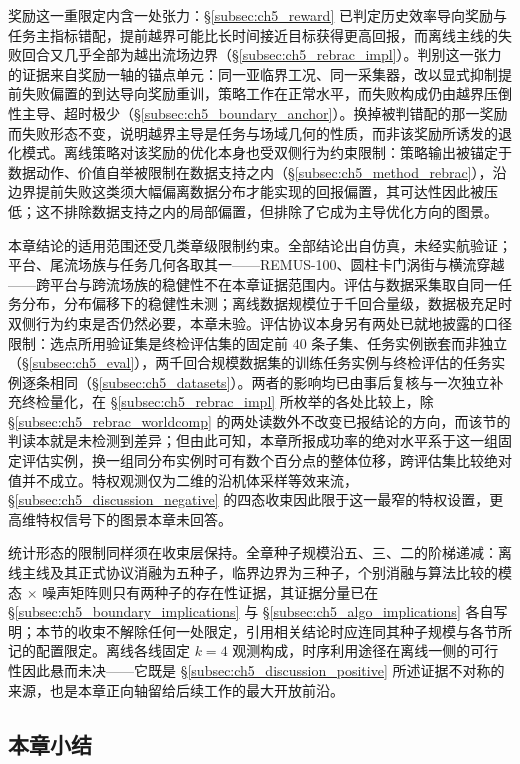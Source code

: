 奖励这一重限定内含一处张力：\S\ref{subsec:ch5_reward} 已判定历史效率导向奖励与任务主指标错配，提前越界可能比长时间接近目标获得更高回报，而离线主线的失败回合又几乎全部为越出流场边界（\S\ref{subsec:ch5_rebrac_impl}）。判别这一张力的证据来自奖励一轴的锚点单元：同一亚临界工况、同一采集器，改以显式抑制提前失败偏置的到达导向奖励重训，策略工作在正常水平，而失败构成仍由越界压倒性主导、超时极少（\S\ref{subsec:ch5_boundary_anchor}）。换掉被判错配的那一奖励而失败形态不变，说明越界主导是任务与场域几何的性质，而非该奖励所诱发的退化模式。离线策略对该奖励的优化本身也受双侧行为约束限制：策略输出被锚定于数据动作、价值自举被限制在数据支持之内（\S\ref{subsec:ch5_method_rebrac}），沿边界提前失败这类须大幅偏离数据分布才能实现的回报偏置，其可达性因此被压低；这不排除数据支持之内的局部偏置，但排除了它成为主导优化方向的图景。

本章结论的适用范围还受几类章级限制约束。全部结论出自仿真，未经实航验证；平台、尾流场族与任务几何各取其一——REMUS-100、圆柱卡门涡街与横流穿越——跨平台与跨流场族的稳健性不在本章证据范围内。评估与数据采集取自同一任务分布，分布偏移下的稳健性未测；离线数据规模位于千回合量级，数据极充足时双侧行为约束是否仍然必要，本章未验。评估协议本身另有两处已就地披露的口径限制：选点所用验证集是终检评估集的固定前 $40$ 条子集、任务实例嵌套而非独立（\S\ref{subsec:ch5_eval}），两千回合规模数据集的训练任务实例与终检评估的任务实例逐条相同（\S\ref{subsec:ch5_datasets}）。两者的影响均已由事后复核与一次独立补充终检量化，在 \S\ref{subsec:ch5_rebrac_impl} 所枚举的各处比较上，除 \S\ref{subsec:ch5_rebrac_worldcomp} 的两处读数外不改变已报结论的方向，而该节的判读本就是未检测到差异；但由此可知，本章所报成功率的绝对水平系于这一组固定评估实例，换一组同分布实例时可有数个百分点的整体位移，跨评估集比较绝对值并不成立。特权观测仅为二维的沿机体采样等效来流，\S\ref{subsec:ch5_discussion_negative} 的四态收束因此限于这一最窄的特权设置，更高维特权信号下的图景本章未回答。

统计形态的限制同样须在收束层保持。全章种子规模沿五、三、二的阶梯递减：离线主线及其正式协议消融为五种子，临界边界为三种子，个别消融与算法比较的模态 $\times$ 噪声矩阵则只有两种子的存在性证据，其证据分量已在 \S\ref{subsec:ch5_boundary_implications} 与 \S\ref{subsec:ch5_algo_implications} 各自写明；本节的收束不解除任何一处限定，引用相关结论时应连同其种子规模与各节所记的配置限定。离线各线固定 $k=4$ 观测构成，时序利用途径在离线一侧的可行性因此悬而未决——它既是 \S\ref{subsec:ch5_discussion_positive} 所述证据不对称的来源，也是本章正向轴留给后续工作的最大开放前沿。

\subsection{本章小结}\label{subsec:ch5_discussion_summary}

